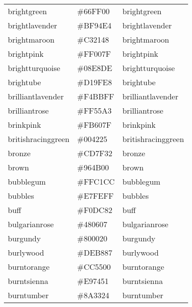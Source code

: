 \documentclass[
]{article}
\begin{document}
\begin{longtable}[]{@{}lll@{}}
brightgreen & \colorbox[rgb]{0.4,1.0,0.0}{\#66FF00} &
\textcolor[rgb]{0.4,1.0,0.0}{brightgreen           }\tabularnewline
brightlavender & \colorbox[rgb]{0.75,0.58,0.89}{\#BF94E4} &
\textcolor[rgb]{0.75,0.58,0.89}{brightlavender        }\tabularnewline
brightmaroon & \colorbox[rgb]{0.76,0.13,0.28}{\#C32148} &
\textcolor[rgb]{0.76,0.13,0.28}{brightmaroon          }\tabularnewline
brightpink & \colorbox[rgb]{1.0,0.0,0.5}{\#FF007F} &
\textcolor[rgb]{1.0,0.0,0.5}{brightpink            }\tabularnewline
brightturquoise & \colorbox[rgb]{0.03,0.91,0.87}{\#08E8DE} &
\textcolor[rgb]{0.03,0.91,0.87}{brightturquoise       }\tabularnewline
brightube & \colorbox[rgb]{0.82,0.62,0.91}{\#D19FE8} &
\textcolor[rgb]{0.82,0.62,0.91}{brightube             }\tabularnewline
brilliantlavender & \colorbox[rgb]{0.96,0.73,1.0}{\#F4BBFF} &
\textcolor[rgb]{0.96,0.73,1.0}{brilliantlavender     }\tabularnewline
brilliantrose & \colorbox[rgb]{1.0,0.33,0.64}{\#FF55A3} &
\textcolor[rgb]{1.0,0.33,0.64}{brilliantrose         }\tabularnewline
brinkpink & \colorbox[rgb]{0.98,0.38,0.5}{\#FB607F} &
\textcolor[rgb]{0.98,0.38,0.5}{brinkpink             }\tabularnewline
britishracinggreen & \colorbox[rgb]{0.0,0.26,0.15}{\#004225} &
\textcolor[rgb]{0.0,0.26,0.15}{britishracinggreen    }\tabularnewline
bronze & \colorbox[rgb]{0.8,0.5,0.2}{\#CD7F32} &
\textcolor[rgb]{0.8,0.5,0.2}{bronze                }\tabularnewline
brown & \colorbox[rgb]{0.59,0.29,0.0}{\#964B00} &
\textcolor[rgb]{0.59,0.29,0.0}{brown                 }\tabularnewline
bubblegum & \colorbox[rgb]{0.99,0.76,0.8}{\#FFC1CC} &
\textcolor[rgb]{0.99,0.76,0.8}{bubblegum             }\tabularnewline
bubbles & \colorbox[rgb]{0.91,1.0,1.0}{\#E7FEFF} &
\textcolor[rgb]{0.91,1.0,1.0}{bubbles               }\tabularnewline
buff & \colorbox[rgb]{0.94,0.86,0.51}{\#F0DC82} &
\textcolor[rgb]{0.94,0.86,0.51}{buff                  }\tabularnewline
bulgarianrose & \colorbox[rgb]{0.28,0.02,0.03}{\#480607} &
\textcolor[rgb]{0.28,0.02,0.03}{bulgarianrose         }\tabularnewline
burgundy & \colorbox[rgb]{0.5,0.0,0.13}{\#800020} &
\textcolor[rgb]{0.5,0.0,0.13}{burgundy              }\tabularnewline
burlywood & \colorbox[rgb]{0.87,0.72,0.53}{\#DEB887} &
\textcolor[rgb]{0.87,0.72,0.53}{burlywood             }\tabularnewline
burntorange & \colorbox[rgb]{0.8,0.33,0.0}{\#CC5500} &
\textcolor[rgb]{0.8,0.33,0.0}{burntorange           }\tabularnewline
burntsienna & \colorbox[rgb]{0.91,0.45,0.32}{\#E97451} &
\textcolor[rgb]{0.91,0.45,0.32}{burntsienna           }\tabularnewline
burntumber & \colorbox[rgb]{0.54,0.2,0.14}{\#8A3324} &
\textcolor[rgb]{0.54,0.2,0.14}{burntumber            }\tabularnewline

\end{longtable}
\end{document}
